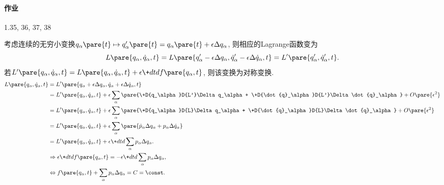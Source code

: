 \documentclass{ctexart}
\begin{document}
\paragraph{作业} %
\label{par:作业}

1.35, 36, 37, 38


\par
考虑连续的无穷小变换$q_\alpha\pare{t}\mapsto q'_\alpha\pare{t} = q_\alpha\pare{t} + \epsilon \Delta q_\alpha$, 则相应的Lagrange函数变为
\[ L\pare{q_\alpha, \dot{q}_\alpha, t} = L\pare{q'_\alpha - \epsilon \Delta q_\alpha, \dot{q}'_\alpha - \epsilon \Delta \dot{q}_\alpha, t} = L'\pare{q'_\alpha, \dot{q}'_\alpha, t}. \]
{\color{red} 若$L'\pare{q_\alpha, \dot{q}_\alpha, t} = L\pare{q_\alpha, \dot{q}_\alpha, t} + \displaystyle \epsilon \+dtd{} f\pare{q_\alpha,t}$, 则该变换为对称变换.}
\begin{align*}
    L\pare{q_\alpha, \dot{q}_\alpha, t} &= L'\pare{q_\alpha+\epsilon\Delta q_\alpha, \dot{q}_\alpha + \epsilon \Delta \dot{q}_\alpha, t} \\
    &= L'\pare{q_\alpha, \dot{q}_\alpha, t} + \epsilon \sum_\alpha \pare{\+D{q_\alpha}D{L'}\Delta q_\alpha + \+D{\dot{q}_\alpha}D{L'}\Delta \dot{q}_\alpha} + O\pare{\epsilon^2} \\
    &= L'\pare{q_\alpha, \dot{q}_\alpha, t} + \epsilon \sum_\alpha \pare{\+D{q_\alpha}D{L}\Delta q_\alpha + \+D{\dot{q}_\alpha}D{L}\Delta \dot{q}_\alpha} + O\pare{\epsilon^2} \\
    &= L'\pare{q_\alpha, \dot{q}_\alpha, t} + \epsilon \sum_\alpha \pare{\dot{p}_\alpha \Delta q_\alpha + p_\alpha \Delta \dot{q}_\alpha} \\
    &= L'\pare{q_\alpha, \dot{q}_\alpha, t} + \epsilon \+dtd{} \sum_{\alpha} p_\alpha \Delta q_\alpha. \\
    &\Rightarrow \epsilon\+dtd{} f\pare{q_\alpha,t} = -\epsilon \+dtd{}\sum_{\alpha} p_\alpha \Delta q_\alpha, \\
    &\Leftrightarrow f\pare{q_\alpha, t} + \sum_\alpha p_\alpha \Delta q_\alpha = C = \const.
\end{align*}
\end{document}
